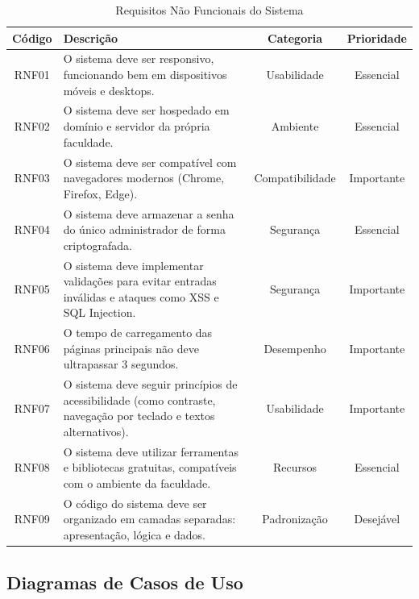 \documentclass[a4paper,12pt]{article}
\begin{document}
\begin{table}[H]
\centering

\label{tab:req-naofuncionais}
\begin{tabularx}{\textwidth}{|c|X|c|c|}
    \hline
    \textbf{Código} & \textbf{Descrição} & \textbf{Categoria} & \textbf{Prioridade} \\
    \hline
    RNF01 & O sistema deve ser responsivo, funcionando bem em dispositivos móveis e desktops. & Usabilidade & Essencial \\
    \hline
    RNF02 & O sistema deve ser hospedado em domínio e servidor da própria faculdade. & Ambiente & Essencial \\
    \hline
    RNF03 & O sistema deve ser compatível com navegadores modernos (Chrome, Firefox, Edge). & Compatibilidade & Importante \\
    \hline
    RNF04 & O sistema deve armazenar a senha do único administrador de forma criptografada. & Segurança & Essencial \\
    \hline
    RNF05 & O sistema deve implementar validações para evitar entradas inválidas e ataques como XSS e SQL Injection. & Segurança & Importante \\
    \hline
    RNF06 & O tempo de carregamento das páginas principais não deve ultrapassar 3 segundos. & Desempenho & Importante \\
    \hline
    RNF07 & O sistema deve seguir princípios de acessibilidade (como contraste, navegação por teclado e textos alternativos). & Usabilidade & Importante \\
    \hline
    RNF08 & O sistema deve utilizar ferramentas e bibliotecas gratuitas, compatíveis com o ambiente da faculdade. & Recursos & Essencial \\
    \hline
    RNF09 & O código do sistema deve ser organizado em camadas separadas: apresentação, lógica e dados. & Padronização & Desejável \\
    \hline
\end{tabularx}
\caption{Requisitos Não Funcionais do Sistema}
\end{table}

\clearpage

\subsection{Diagramas de Casos de Uso}
\end{document}
